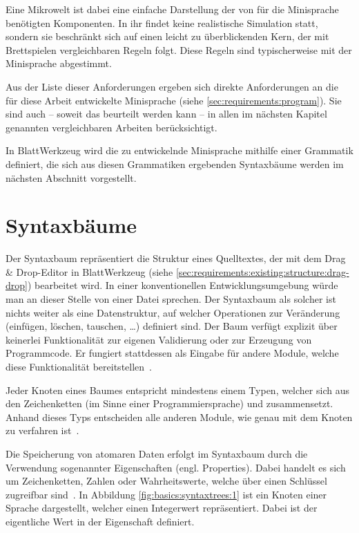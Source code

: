 Eine Mikrowelt ist dabei eine einfache Darstellung der von für die Minisprache benötigten Komponenten. In ihr findet keine realistische Simulation statt, sondern sie beschränkt sich auf einen leicht zu überblickenden Kern, der mit Brettspielen vergleichbaren Regeln folgt. Diese Regeln sind typischerweise mit der Minisprache abgestimmt.

Aus der Liste dieser Anforderungen ergeben sich direkte Anforderungen an die für diese Arbeit entwickelte Minisprache (siehe \ref{sec:requirements:program}). Sie sind auch -- soweit das beurteilt werden kann -- in allen im nächsten Kapitel genannten vergleichbaren Arbeiten berücksichtigt.

In BlattWerkzeug wird die zu entwickelnde Minisprache mithilfe einer Grammatik definiert, die sich aus diesen Grammatiken ergebenden Syntaxbäume werden im nächsten Abschnitt vorgestellt.

\section{Syntaxbäume}
\label{sec:basics:syntaxtrees}

Der Syntaxbaum repräsentiert die Struktur eines Quelltextes, der mit dem Drag \& Drop-Edi\-tor in BlattWerkzeug (siehe \ref{sec:requirements:existing:structure:drag-drop}) bearbeitet wird. In einer konventionellen Entwicklungsumgebung würde man an dieser Stelle von einer Datei sprechen. Der Syntaxbaum als solcher ist nichts weiter als eine Datenstruktur, auf welcher Operationen zur Veränderung (einfügen, löschen, tauschen, \dots) definiert sind. Der Baum verfügt explizit über keinerlei Funktionalität zur eigenen Validierung oder zur Erzeugung von Programmcode. Er fungiert stattdessen als Eingabe für andere Module, welche diese Funktionalität bereitstellen~\cite[3]{riemer2018}.

Jeder Knoten eines Baumes entspricht mindestens einem Typen, welcher sich aus den Zeichenketten  (im Sinne einer Programmiersprache) und  zusammensetzt. Anhand dieses Typs entscheiden alle anderen Module, wie genau mit dem Knoten zu verfahren ist~\cite[4]{riemer2018}.

Die Speicherung von atomaren Daten erfolgt im Syntaxbaum durch die Verwendung sogenannter Eigenschaften (engl. Properties). Dabei handelt es sich um Zeichenketten, Zahlen oder Wahrheitswerte, welche über einen Schlüssel zugreifbar sind~\cite[4]{riemer2018}. In Abbildung \ref{fig:basics:syntaxtrees:1} ist ein Knoten  einer Sprache  dargestellt, welcher einen Integerwert repräsentiert. Dabei ist der eigentliche Wert in der Eigenschaft  definiert.

